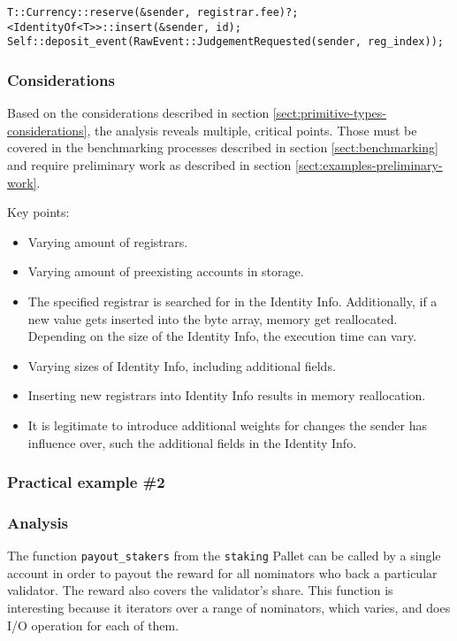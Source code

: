 \documentclass[11pt,a4paper]{article}
\begin{document}
\begin{verbatim}
T::Currency::reserve(&sender, registrar.fee)?;
<IdentityOf<T>>::insert(&sender, id);
Self::deposit_event(RawEvent::JudgementRequested(sender, reg_index));
\end{verbatim}

\subsubsection*{Considerations}

Based on the considerations described in section
\ref{sect:primitive-types-considerations}, the analysis reveals multiple,
critical points. Those must be covered in the benchmarking processes described
in section \ref{sect:benchmarking} and require preliminary work as described in
section \ref{sect:examples-preliminary-work}.
\newline

Key points:
\begin{itemize}
  \item Varying amount of registrars.
  \item Varying amount of preexisting accounts in storage.
  \item The specified registrar is searched for in the Identity Info.
  Additionally, if a new value gets inserted into the byte array, memory get
  reallocated. Depending on the size of the Identity Info, the execution time
  can vary.
  \item Varying sizes of Identity Info, including additional fields.
  \item Inserting new registrars into Identity Info results in memory
  reallocation.
  \item It is legitimate to introduce additional weights for changes the sender
  has influence over, such the additional fields in the Identity Info.
\end{itemize}

\subsubsection{Practical example \#2}

\subsubsection*{Analysis}

The function \verb|payout_stakers| from the \verb|staking| Pallet can be called
by a single account in order to payout the reward for all nominators who back a
particular validator. The reward also covers the validator's share. This
function is interesting because it iterators over a range of nominators, which
varies, and does I/O operation for each of them.
\newline
\end{document}
